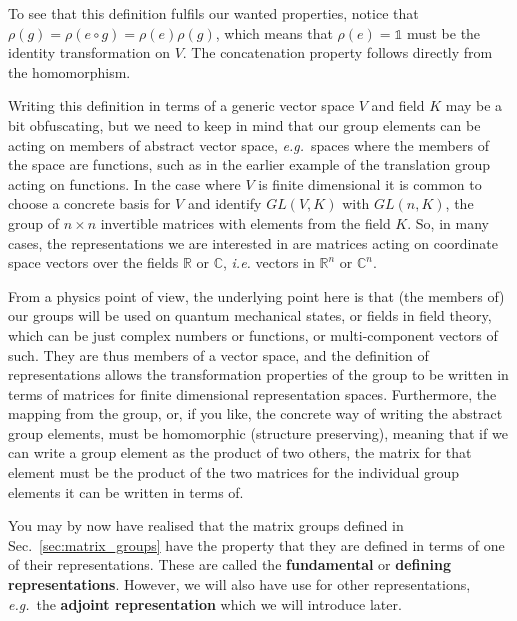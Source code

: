 \documentclass[notes.tex]{subfiles}
\begin{document}
To see that this definition fulfils our wanted properties, notice that $\rho(g)=\rho(e\circ g)=\rho(e)\rho(g)$, which means that $\rho(e)= \mathbb{1}$ must be the identity transformation on $V$. The concatenation property follows directly from the homomorphism.

Writing this definition in terms of a generic vector space $V$ and field $K$ may be a bit obfuscating, but we need to keep in mind that our group elements can be acting on members of abstract vector space, {\it e.g.}\ spaces where the members of the space are functions, such as in the earlier example of the translation group acting on functions. In the case where $V$ is finite dimensional it is common to choose a concrete basis for $V$ and identify $GL(V,K)$ with $GL(n, K)$, the group of $n\times n$ invertible matrices with elements from the field $K$. So, in many cases, the representations we are interested in are matrices acting on coordinate space vectors over the fields $\mathbb R$ or $\mathbb C$, {\it i.e.} vectors in $\mathbb R^n$ or $\mathbb C^n$.

From a physics point of view, the underlying point here is that (the members of) our groups will be used on quantum mechanical states, or fields in field theory, which can be just complex numbers or functions, or multi-component vectors of such. They are thus members of a vector space, and the definition of representations allows the transformation properties of the group to be written in terms of matrices for finite dimensional representation spaces. Furthermore, the mapping from the group, or, if you like, the concrete way of writing the abstract group elements, must be homomorphic (structure preserving), meaning that if we can write a group element as the product of two others, the matrix for that element must be the product of the two matrices for the individual group elements it can be written in terms of.


You may by now have realised that the matrix groups defined in Sec.~\ref{sec:matrix_groups} have the property that they are defined in terms of one of their representations. These are called the {\bf fundamental} or {\bf defining  representations}. However, we will also have use for other representations, {\it e.g.}\ the {\bf adjoint representation} which we will introduce later.
\end{document}
